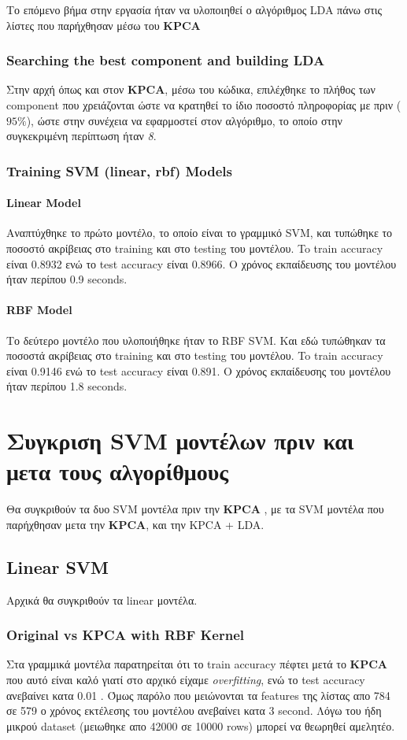 Το επόμενο βήμα στην εργασία ήταν να υλοποιηθεί ο αλγόριθμος LDA πάνω στις λίστες που παρήχθησαν μέσω του \textbf{KPCA}
\subsubsection{Searching the best component  and building LDA  }

Στην αρχή όπως και στον \textbf{KPCA}, μέσω του κώδικα, επιλέχθηκε το πλήθος των component που χρειάζονται ώστε να κρατηθεί το ίδιο ποσοστό πληροφορίας με πριν ($95\%$), ώστε στην συνέχεια να εφαρμοστεί στον αλγόριθμο, το οποίο στην συγκεκριμένη περίπτωση ήταν \emph{8}.

\subsubsection{Training SVM (linear, rbf) Models}

\paragraph{Linear Model}

Αναπτύχθηκε το πρώτο μοντέλο, το οποίο είναι το γραμμικό SVM, και
τυπώθηκε το ποσοστό ακρίβειας στο training και στο testing του μοντέλου. To train accuracy είναι 0.8932 ενώ το test
accuracy είναι 0.8966. Ο χρόνος εκπαίδευσης του μοντέλου ήταν περίπου 0.9 seconds.

\paragraph{RBF Model}

Το δεύτερο μοντέλο που υλοποιήθηκε ήταν το RBF SVM. Και εδώ τυπώθηκαν τα ποσοστά
ακρίβειας στο training και στο testing του μοντέλου. To train accuracy είναι 0.9146 ενώ το test accuracy είναι 0.891. Ο χρόνος εκπαίδευσης του μοντέλου ήταν περίπου 1.8 seconds.

\newpage
\section{Συγκριση SVM μοντέλων πριν και μετα τους αλγορίθμους}
Θα συγκριθούν τα δυο SVM μοντέλα πριν την \textbf{KPCA} , με τα SVM μοντέλα που παρήχθησαν μετα την \textbf{KPCA}, και την KPCA + LDA. 
\subsection{Linear SVM}
Αρχικά θα συγκριθούν τα linear μοντέλα.
\subsubsection{Original vs KPCA with RBF Kernel}
Στα γραμμικά μοντέλα παρατηρείται ότι το train accuracy πέφτει μετά το \textbf{KPCA} που αυτό είναι καλό γιατί στο αρχικό είχαμε \emph{overfitting}, ενώ το test accuracy ανεβαίνει κατα 0.01 . Όμως παρόλο που μειώνονται τα features της λίστας απο 784 σε 579 ο χρόνος εκτέλεσης του μοντέλου ανεβαίνει κατα 3 second. Λόγω του ήδη μικρού dataset (μειωθηκε απο 42000 σε 10000 rows) μπορεί να θεωρηθεί αμελητέο.

